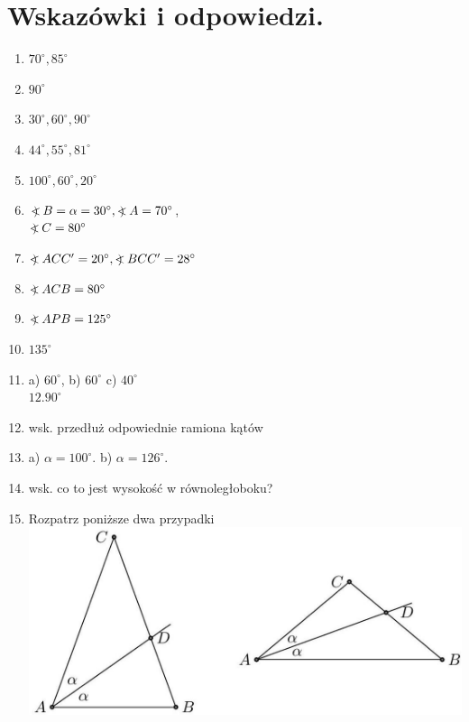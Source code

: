\documentclass[10pt]{article}
\newcommand\Varangle{\mathop{{<\!\!\!\!\!\text{\small)}}\:}\nolimits}
\begin{document}
\section*{Wskazówki i odpowiedzi.}
\begin{enumerate}
  \item \(70^{\circ}, 85^{\circ}\)
  \item \(90^{\circ}\)
  \item \(30^{\circ}, 60^{\circ}, 90^{\circ}\)
  \item \(44^{\circ}, 55^{\circ}, 81^{\circ}\)
  \item \(100^{\circ}, 60^{\circ}, 20^{\circ}\)
  \item \(\Varangle B=\alpha=30^{\circ}, \Varangle A=70^{\circ}\),\\
\(\Varangle C=80^{\circ}\)
  \item \(\Varangle A C C^{\prime}=20^{\circ}, \Varangle B C C^{\prime}=28^{\circ}\)
  \item \(\Varangle A C B=80^{\circ}\)
  \item \(\Varangle A P B=125^{\circ}\)
  \item \(135^{\circ}\)
  \item a) \(60^{\circ}\), b) \(60^{\circ}\) c) \(40^{\circ}\)\\
\(12.90^{\circ}\)
  \item wsk. przedłuż odpowiednie ramiona kątów
  \item a) \(\alpha=100^{\circ}\). b) \(\alpha=126^{\circ}\).
  \item wsk. co to jest wysokość w równoległoboku?
  \item Rozpatrz poniższe dwa przypadki\\
\includegraphics[max width=\textwidth, center]{2024_11_21_71f62bd117d375398909g-027(1)}
\end{enumerate}
\end{document}
